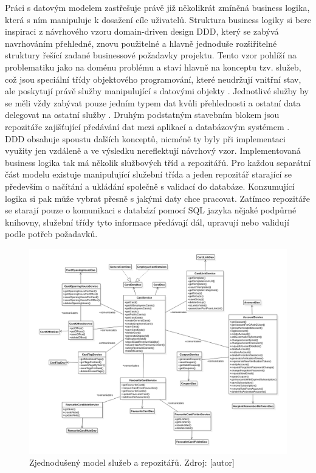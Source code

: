 		Práci s datovým modelem zastřešuje právě již několikrát zmíněná business logika, která s ním manipuluje k dosažení
		cíle uživatelů.
		Struktura business logiky si bere inspiraci z návrhového vzoru domain-driven design \ac{DDD}, který se zabývá
		navrhováním přehledné, znovu použitelné a hlavně jednoduše rozšiřitelné struktury řešící zadané businessové požadavky
		projektu.
		Tento vzor pohlíží na problematiku jako na doménu problému a staví hlavně na konceptu tzv. služeb,
		což jsou speciální třídy objektového programování, které
		neudržují vnitřní stav, ale poskytují právě služby manipulující s datovými objekty \cite{ddd_quickly}.
		Jednotlivé služby by se měli vždy zabývat pouze jedním typem dat kvůli přehlednosti a ostatní data delegovat na
		ostatní služby \cite{ddd_quickly}.
		Druhým podstatným stavebním blokem jsou repozitáře zajišťující předávání dat mezi aplikací a databázovým systémem
		\cite{ddd_quickly}.
		\ac{DDD} obsahuje spoustu dalších konceptů, nicméně ty byly při implementaci využity jen vzdáleně a ve výsledku
		nereflektují návrhový vzor.
		Implementovaná business logika tak má několik službových tříd a repozitářů.
		Pro každou separátní část modelu existuje manipulující služební třída a jeden repozitář starající se především o
		načítání a ukládání společně s validací do databáze.
		Konzumující logika si pak může vybrat přesně s jakými daty chce pracovat.
		Zatímco repozitáře se starají pouze o komunikaci s databází pomocí \ac{SQL} jazyka nějaké podpůrné knihovny,
		služební třídy tyto informace předávají dál, upravují nebo validují podle potřeb požadavků.

		\begin{figure}[H]
			\centering
			\includegraphics[width=\linewidth]{obrazky/sluzby_a_repozitare}\hfill
			\caption{Zjednodušený model služeb a repozitářů. Zdroj: [autor]}
		\end{figure}

